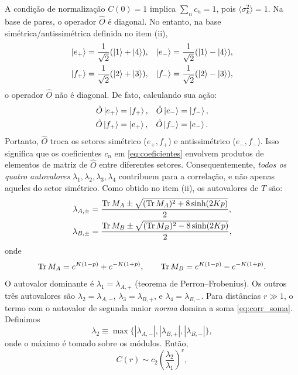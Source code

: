 \documentclass[11pt,a4paper]{article}
\begin{document}
%
A condição de normalização \(C(0) = 1\) implica \(\sum_n c_n = 1\), pois \(\langle \sigma_k^2 \rangle = 1\).
%
Na base de pares, o operador \(\hat O\) é diagonal. No entanto, na base simétrica/antissimétrica definida no item (ii),
%
\begin{align}
    \ket{e_+} &= \frac{1}{\sqrt{2}}(\ket{1}+\ket{4}), &
    \ket{e_-} &= \frac{1}{\sqrt{2}}(\ket{1}-\ket{4}), \\
    \ket{f_+} &= \frac{1}{\sqrt{2}}(\ket{2}+\ket{3}), &
    \ket{f_-} &= \frac{1}{\sqrt{2}}(\ket{2}-\ket{3}),
\end{align}
%
o operador \(\hat O\) não é diagonal. De fato, calculando sua ação:
%
\begin{align}
    \hat O \ket{e_+} &= \ket{f_+}, &
    \hat O \ket{e_-} &= \ket{f_-}, \\
    \hat O \ket{f_+} &= \ket{e_+}, &
    \hat O \ket{f_-} &= \ket{e_-}.
\end{align}
%
Portanto, \(\hat O\) troca os setores simétrico (\(e_+, f_+\)) e antissimétrico (\(e_-, f_-\)). Isso significa que os coeficientes \(c_n\) em \eqref{eq:coeficientes} envolvem produtos de elementos de matriz de \(\hat O\) entre diferentes setores. Consequentemente, \emph{todos os quatro autovalores} \(\lambda_1, \lambda_2, \lambda_3, \lambda_4\) contribuem para a correlação, e não apenas aqueles do setor simétrico.
%
Como obtido no item (ii), os autovalores de \(T\) são:
%
\begin{align}
    \lambda_{A,\pm} &= \frac{\Tr M_A \pm \sqrt{(\Tr M_A)^2 + 8\sinh(2Kp)}}{2}, \\
    \lambda_{B,\pm} &= \frac{\Tr M_B \pm \sqrt{(\Tr M_B)^2 - 8\sinh(2Kp)}}{2},
\end{align}
%
onde
%
\begin{equation}
    \Tr M_A = e^{K(1-p)} + e^{-K(1+p)}, \qquad
    \Tr M_B = e^{K(1-p)} - e^{-K(1+p)}.
\end{equation}
%
O autovalor dominante é \(\lambda_1 = \lambda_{A,+}\) (teorema de Perron–Frobenius). Os outros três autovalores são \(\lambda_2 = \lambda_{A,-}\), \(\lambda_3 = \lambda_{B,+}\), e \(\lambda_4 = \lambda_{B,-}\).
%
Para distâncias \(r \gg 1\), o termo com o autovalor de segunda maior \emph{norma} domina a soma \eqref{eq:corr_soma}. Definimos
%
\begin{equation}
    \lambda_2 \equiv \max\{ |\lambda_{A,-}|, |\lambda_{B,+}|, |\lambda_{B,-}| \},
\end{equation}
%
onde o máximo é tomado sobre os módulos. Então,
%
\begin{equation}
    C(r) \sim c_2 \left( \frac{\lambda_2}{\lambda_1} \right)^r,
\end{equation}
\end{document}
